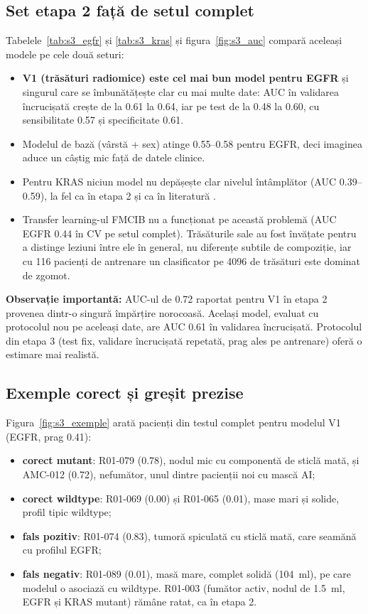\documentclass[runningheads,a4paper,11pt]{report}
\begin{document}
\subsection{Set etapa 2 față de setul complet}
Tabelele~\ref{tab:s3_egfr} și \ref{tab:s3_kras} și figura~\ref{fig:s3_auc} compară aceleași modele pe cele două seturi:
\begin{itemize}
    \item \textbf{V1 (trăsături radiomice) este cel mai bun model pentru EGFR} și singurul care se îmbunătățește clar cu mai multe date: AUC în validarea încrucișată crește de la 0.61 la 0.64, iar pe test de la 0.48 la 0.60, cu sensibilitate 0.57 și specificitate 0.61.
    \item Modelul de bază (vârstă + sex) atinge 0.55--0.58 pentru EGFR, deci imaginea aduce un câștig mic față de datele clinice.
    \item Pentru KRAS niciun model nu depășește clar nivelul întâmplător (AUC 0.39--0.59), la fel ca în etapa 2 și ca în literatură \cite{gevaert2017}.
    \item Transfer learning-ul FMCIB nu a funcționat pe această problemă (AUC EGFR 0.44 în CV pe setul complet). Trăsăturile sale au fost învățate pentru a distinge leziuni între ele în general, nu diferențe subtile de compoziție, iar cu 116 pacienți de antrenare un clasificator pe 4096 de trăsături este dominat de zgomot.
\end{itemize}
\textbf{Observație importantă:} AUC-ul de 0.72 raportat pentru V1 în etapa 2 provenea dintr-o singură împărțire norocoasă. Același model, evaluat cu protocolul nou pe aceleași date, are AUC 0.61 în validarea încrucișată. Protocolul din etapa 3 (test fix, validare încrucișată repetată, prag ales pe antrenare) oferă o estimare mai realistă.

\subsection{Exemple corect și greșit prezise}
Figura~\ref{fig:s3_exemple} arată pacienți din testul complet pentru modelul V1 (EGFR, prag 0.41):
\begin{itemize}
    \item \textbf{corect mutant}: R01-079 (0.78), nodul mic cu componentă de sticlă mată, și AMC-012 (0.72), nefumător, unul dintre pacienții noi cu mască AI;
    \item \textbf{corect wildtype}: R01-069 (0.00) și R01-065 (0.01), mase mari și solide, profil tipic wildtype;
    \item \textbf{fals pozitiv}: R01-074 (0.83), tumoră spiculată cu sticlă mată, care seamănă cu profilul EGFR;
    \item \textbf{fals negativ}: R01-089 (0.01), masă mare, complet solidă (104~ml), pe care modelul o asociază cu wildtype. R01-003 (fumător activ, nodul de 1.5~ml, EGFR și KRAS mutant) rămâne ratat, ca în etapa 2.
\end{itemize}
\end{document}
